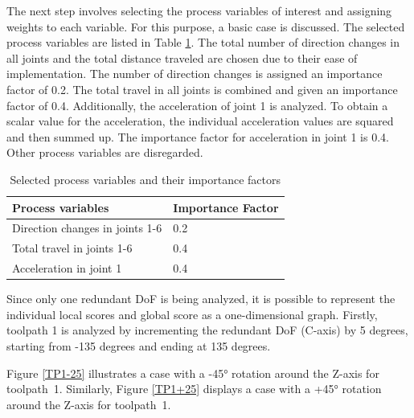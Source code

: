 The next step involves selecting the process variables of interest and assigning weights to each variable. For this purpose, a basic case is discussed. The selected process variables are listed in Table \ref{PPbasic}. The total number of direction changes in all joints and the total distance traveled are chosen due to their ease of implementation. The number of direction changes is assigned an importance factor of 0.2.
The total travel in all joints is combined and given an importance factor of 0.4.
Additionally, the acceleration of joint 1 is analyzed. To obtain a scalar value for the acceleration, the individual acceleration values are squared and then summed up. The importance factor for acceleration in joint 1 is 0.4. Other process variables are disregarded.

\begin{table}[H]
	\centering
	\begin{tabular}{||l|l||}
		Process variables& Importance Factor \\
		\hline
		\hline
		\hline
		Direction changes in joints 1-6	&		0.2 \\
		Total travel in joints 1-6	&  	0.4 \\
		Acceleration in joint 1	& 		0.4\\
		
		\hline
		\hline
	\end{tabular}
	
	\caption{Selected process variables and their importance factors}
	\label{PPbasic}
\end{table}


Since only one redundant \acrshort{DoF} is being analyzed, it is possible to represent the individual local scores and global score as a one-dimensional graph. Firstly, toolpath 1 is analyzed by incrementing the redundant \acrshort{DoF} (C-axis) by 5 degrees, starting from -135 degrees and ending at 135 degrees.


\newpage


Figure \ref{TP1-25} illustrates a case with a -45° rotation around the Z-axis for toolpath~1.
Similarly, Figure \ref{TP1+25} displays a case with a +45° rotation around the Z-axis for toolpath~1.

